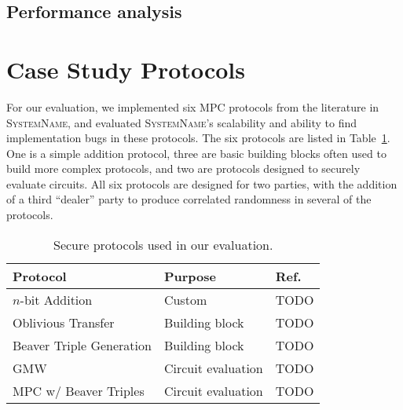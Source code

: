 \documentclass[conference]{IEEEtran}
\newcommand{\system}{\textsc{SystemName}\xspace}
\begin{document}
\subsection{Performance analysis}


\section{Case Study Protocols}
\label{sec:case-study-protocols}

For our evaluation, we implemented six MPC protocols from the literature in \system, and evaluated \system's scalability and ability to find implementation bugs in these protocols. The six protocols are listed in Table~\ref{tbl:protocols}. One is a simple addition protocol, three are basic building blocks often used to build more complex protocols, and two are protocols designed to securely evaluate circuits. All six protocols are designed for two parties, with the addition of a third ``dealer'' party to produce correlated randomness in several of the protocols.

\begin{table}
\centering
  \begin{tabular}{|l | l|l|}
    \hline
    \textbf{Protocol} & \textbf{Purpose} & \textbf{Ref.} \\
    \hline
    $n$-bit Addition & Custom & TODO \\
    Oblivious Transfer & Building block & TODO \\
    Beaver Triple Generation & Building block & TODO \\
    GMW & Circuit evaluation & TODO \\
    MPC w/ Beaver Triples & Circuit evaluation & TODO \\
    \hline
  \end{tabular}
  \caption{Secure protocols used in our evaluation.}
  \label{tbl:protocols}
\end{table}
\end{document}
